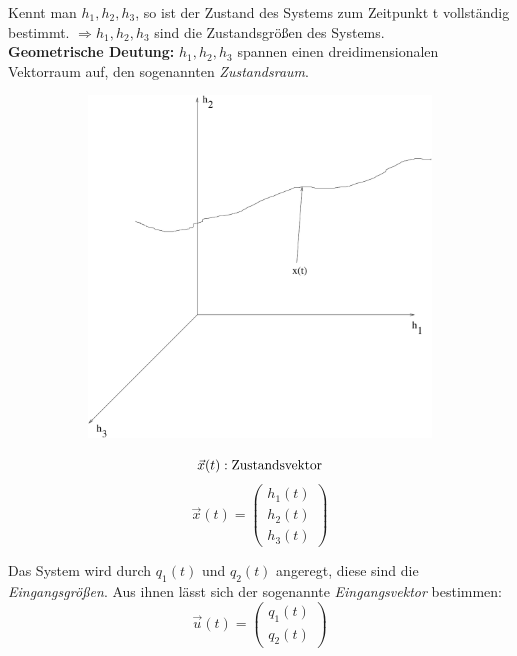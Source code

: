 \message{ !name(Mitschrieb_SysRegel.tex)}\documentclass[12pt,a4paper,ngerman]{scrartcl}
\begin{document}
Kennt man $h_1,h_2,h_3$, so ist der Zustand des Systems zum Zeitpunkt t vollständig bestimmt. $\Rightarrow h_1,h_2,h_3$ sind die Zustandsgrößen des Systems.\\
\textbf{Geometrische Deutung:} $h_1,h_2,h_3$ spannen einen dreidimensionalen Vektorraum auf, den sogenannten \emph{Zustandsraum}.\\
\begin{figure}[H]
  \begin{minipage}{0.5\linewidth}
    \begin{figure}[H]
      \includegraphics[width=0.9\linewidth]{sysregel_zustandsraum}
    \end{figure}
  \end{minipage}
  \begin{minipage}{0.5\linewidth}
    \[\vec{x}(t): \text{Zustandsvektor}\\\]
    \[\vec{x}(t)=  \begin{pmatrix}
            h_1(t) \\
            h_2(t) \\
            h_3(t) \end{pmatrix} \] 
  \end{minipage}
\end{figure}
Das System wird durch $q_1(t)$ und $q_2(t)$ angeregt, diese sind die \emph{Eingangsgrößen}. Aus ihnen lässt sich der sogenannte \emph{Eingangsvektor} bestimmen:
\begin{equation*}
  \vec{u}(t)=\begin{pmatrix}
                            q_1(t)\\
                            q_2(t)
             \end{pmatrix}
\end{equation*}
\end{document}
